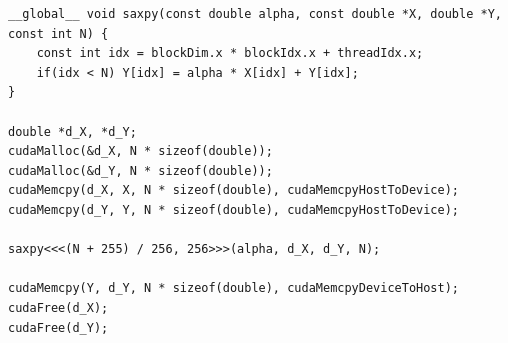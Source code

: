 \begin{listing}
    \begin{verbatim}
__global__ void saxpy(const double alpha, const double *X, double *Y, const int N) {
    const int idx = blockDim.x * blockIdx.x + threadIdx.x;
    if(idx < N) Y[idx] = alpha * X[idx] + Y[idx];
}
    
double *d_X, *d_Y;
cudaMalloc(&d_X, N * sizeof(double));
cudaMalloc(&d_Y, N * sizeof(double));
cudaMemcpy(d_X, X, N * sizeof(double), cudaMemcpyHostToDevice);
cudaMemcpy(d_Y, Y, N * sizeof(double), cudaMemcpyHostToDevice);

saxpy<<<(N + 255) / 256, 256>>>(alpha, d_X, d_Y, N);

cudaMemcpy(Y, d_Y, N * sizeof(double), cudaMemcpyDeviceToHost);
cudaFree(d_X);
cudaFree(d_Y);
    \end{verbatim}
    \caption{%
    SAXPY example using \gls{cuda}. 
}
\end{listing}
